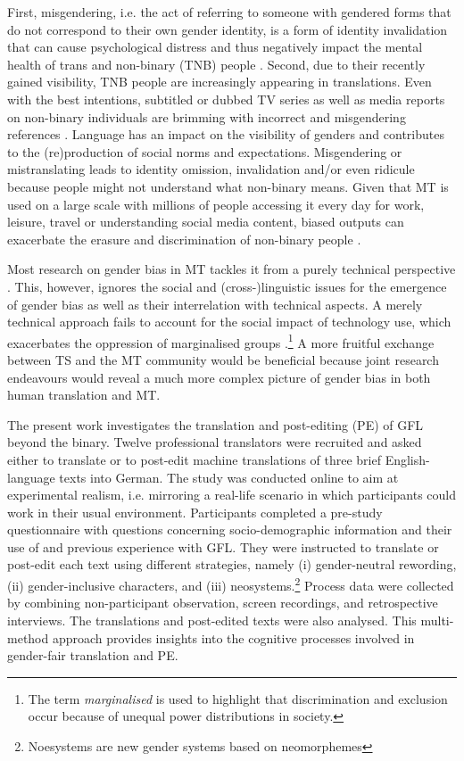 First, misgendering, i.e. the act of referring to someone with gendered forms that do not correspond to their own gender identity, is a form of identity invalidation that can cause psychological distress and thus negatively impact the mental health of trans and non-binary (TNB) people \citep{mclemore2015experiences,mclemore2018minority}. Second, due to their recently gained visibility, TNB people are increasingly appearing in translations. Even with the best intentions, subtitled or dubbed TV series as well as media reports on non-binary individuals are brimming with incorrect and misgendering references \citep{lopez2022trans,attig2023call,lardellitranslating}. Language has an impact on the visibility of genders and contributes to the (re)production of social norms and expectations. Misgendering or mistranslating leads to identity omission, invalidation and/or even ridicule because people might not understand what non-binary means. Given that MT is used on a large scale with millions of people accessing it every day for work, leisure, travel or understanding social media content, biased outputs can exacerbate the erasure and discrimination of non-binary people \citep{dev-etal-2021-harms}.

Most research on gender bias in MT tackles it from a purely technical perspective \citep{savoldi2021gender}. This, however, ignores the social and (cross-)linguistic issues for the emergence of gender bias as well as their interrelation with technical aspects. A merely technical approach fails to account for the social impact of technology use, which exacerbates the oppression of marginalised groups \citep{bender2021dangers,o2017weapons}.\footnote{The term \textit{marginalised} is used to highlight that discrimination and exclusion occur because of unequal power distributions in society.} A more fruitful exchange between TS and the MT community would be beneficial because joint research endeavours would reveal a much more complex picture of gender bias in both human translation and MT. 

The present work investigates the translation and post-editing (PE) of GFL beyond the binary. Twelve professional translators were recruited and asked either to translate or to post-edit machine translations of three brief English-language texts into German. The study was conducted online to aim at experimental realism, i.e. mirroring a real-life scenario in which participants could work in their usual environment. Participants completed a pre-study questionnaire with questions concerning socio-demographic information and their use of and previous experience with GFL. They were instructed to translate or post-edit each text using different  strategies, namely (i) gender-neutral rewording, (ii) gender-inclusive characters, and (iii) neosystems.\footnote{Noesystems are new gender systems based on neomorphemes} Process data were collected by combining non-participant observation, screen recordings, and retrospective interviews. The translations and post-edited texts were also analysed. This multi-method approach provides insights into the cognitive processes involved in gender-fair translation and PE. 

